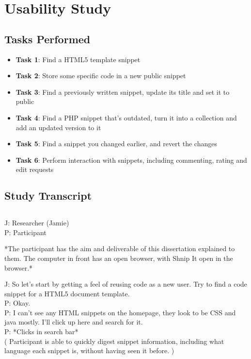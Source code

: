 \chapter{Usability Study}

\section{Tasks Performed} \label{usabilitystudytasks}
\begin{itemize}
\item \textbf{Task 1}: Find a HTML5 template snippet
\item \textbf{Task 2}: Store some specific code in a new public snippet
\item \textbf{Task 3}: Find a previously written snippet, update its title and set it to public
\item \textbf{Task 4}: Find a PHP snippet that's outdated, turn it into a collection and add an updated version to it
\item \textbf{Task 5}: Find a snippet you changed earlier, and revert the changes
\item \textbf{Task 6}: Perform interaction with snippets, including commenting, rating and edit requests
\end{itemize}

\section{Study Transcript} \label{usabilitystudytrans}

\begin{lstlisting}[caption={Transcription of Usability Study}]
\end{lstlisting}
J: Researcher (Jamie) \\
P: Participant

*The participant has the aim and deliverable of this dissertation explained to them. The computer in front has an open browser, with Shnip It open in the browser.*

J: \-\hspace{1.4cm} So let’s start by getting a feel of reusing code as a new user. Try to find a code snippet for a HTML5 document template. \\
P: Okay. \\
P: I can’t see any HTML snippets on the homepage, they look to be CSS and java mostly. I’ll click up here and search for it.  \\
P: *Clicks in search bar* \\
( Participant is able to quickly digest snippet information, including what language each snippet is, without having seen it before. )

